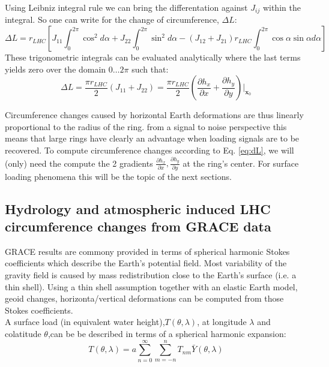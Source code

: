 \documentclass[a4paper,10pt,twoside,openany]{article}
\begin{document}
Using Leibniz integral rule we can bring the differentation against
$J_{ij}$ within the integral. So one can write for the change of
circumference, $\Delta L$:
\begin{equation}
\Delta L = r_{LHC}\left[J_{11}\int_{0}^{2\pi} \cos^{2} d\alpha +
J_{22}\int_{0}^{2\pi} \sin^{2} d\alpha -
(J_{12}+J_{21})r_{LHC}\int_{0}^{2\pi} \cos\alpha\sin\alpha d\alpha\right]
\end{equation}
These trigonometric integrals can be evaluated analytically where the
last terms yields zero over the domain $0\ldots 2\pi$ such that:
\begin{equation}
  \Delta L = \frac{\pi r_{LHC}}{2 } (J_{11} + J_{22})=\frac{\pi
    r_{LHC}}{2 } \left(\frac{\partial h_{x}}{\partial
    x}+\frac{\partial h_{y}}{\partial y}\right)\bigg|_{\textbf{x}_{0}}
  \label{eq:dL}
\end{equation}


Circumference changes caused by horizontal Earth deformations are
thus linearly proportional to the radius of the ring. from a signal to
noise perspective this means that large rings have clearly an
advantage when loading signals are to be recovered. To compute
circumference changes according to Eq. \ref{eq:dL}, we will (only)
need the compute the  2 gradients $\frac{\partial h_{x}}{\partial x},\frac{\partial h_{y}}{\partial y}$ at the ring's
center. For surface loading phenomena this will be the topic of the
next sections.

\subsection{Hydrology and atmospheric induced LHC circumference
  changes from GRACE data}

GRACE results are commony provided in terms of spherical harmonic
Stokes coefficients which describe the Earth's potential field. Most
variability of the gravity field is caused by mass redistribution
close to the Earth's surface (i.e. a  thin shell). Using a thin shell
assumption together with an elastic Earth model, geoid changes,
horizonta/vertical deformations can be computed from those Stokes
coefficients.\\

A surface load (in equivalent water height),$T(\theta,\lambda)$, at
longitude $\lambda$ and colatitude $\theta$,can be be described in
terms of a spherical harmonic expansion:
\begin{equation}
  T(\theta,\lambda)=a\sum_{n=0}^{\infty}\sum_{m=-n}^{n} T_{nm} \bar{Y}(\theta,\lambda)
\end{equation}
\end{document}
